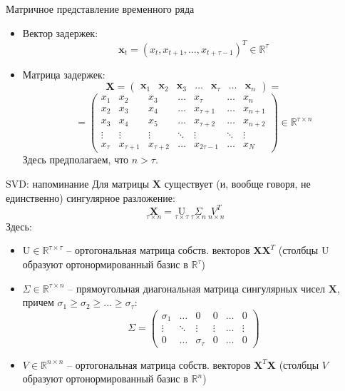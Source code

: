 \begin{frame}{Матричное представление временного ряда}
\begin{itemize}
    \item Вектор задержек: 
    $$ \mathbf{x}_t = (x_t, x_{t+1}, \dots, x_{t + \tau - 1})^T \in \mathbb{R}^{\tau}$$
    \item Матрица задержек:
    $$\mathbf{X} = 
    \begin{pmatrix}
    \mathbf{x}_1 & \mathbf{x}_2 & \mathbf{x}_3 & \dots & \mathbf{x}_{\tau} & \dots & \mathbf{x}_n
    \end{pmatrix} = $$
    $$ = \begin{pmatrix}
    x_1 & x_2 & x_3 & \dots & x_{\tau} & \dots & x_n \\
    x_2 & x_3 & x_4 & \dots & x_{\tau + 1} & \dots & x_{n + 1} \\
    x_3 & x_4 & x_5 & \dots & x_{\tau + 2} & \dots & x_{n + 2} \\
    \vdots & \vdots & \vdots & \ddots & \vdots & \ddots & \vdots \\
    x_{\tau} & x_{\tau + 1} & x_{\tau + 2} & \dots & x_{2\tau - 1} & \dots & x_N 
    \end{pmatrix} \in \mathbb{R}^{\tau \times n}$$
    Здесь предполагаем, что $n > \tau$.
\end{itemize}
\end{frame}
\begin{frame}{SVD: напоминание}
    Для матрицы $\mathbf{X}$ существует (и, вообще говоря, не единственно) сингулярное разложение:
    $$ \underset{\tau \times n}{\mathbf{X}} = \underset{\tau \times \tau}{\text{U}} \ \underset{\tau \times n}{\Sigma} \ \underset{n \times n}{V^T}$$
    Здесь:
    \begin{itemize}
        \item $\text{U} \in \mathbb{R}^{\tau \times \tau}$ -- ортогональная матрица собств. векторов $\mathbf{X}\mathbf{X}^T$ (столбцы $\text{U}$ образуют ортонормированный базис в $\mathbb{R}^{\tau}$)
        \item $\Sigma \in \mathbb{R}^{\tau \times n}$ -- прямоугольная диагональная матрица сингулярных чисел $\mathbf{X}$, причем $\sigma_1 \geq \sigma_2 \geq \dots \geq \sigma_{\tau}$:
        $$ \Sigma = \begin{pmatrix}
            \sigma_1  & \dots & 0 & 0 & \dots & 0 \\
            \vdots  & \ddots & \vdots & \vdots & \dots & \vdots \\
            0 &  \dots & \sigma_{\tau} & 0 & \dots & 0
        \end{pmatrix}$$
        \item $V \in \mathbb{R}^{n \times n}$ -- ортогональная матрица собств. векторов $\mathbf{X}^T\mathbf{X}$ (столбцы $V$ образуют ортонормированный базис в $\mathbb{R}^{n}$)
    \end{itemize}
\end{frame}
